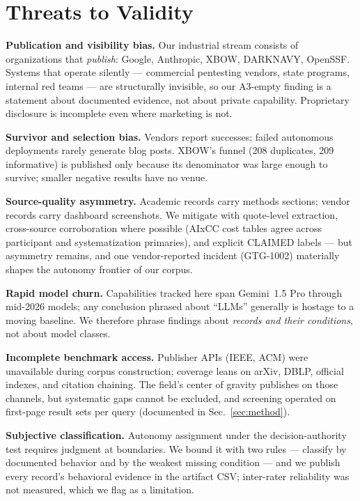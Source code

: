 \section{Threats to Validity}
\label{sec:threats}

\textbf{Publication and visibility bias.} Our industrial stream consists of organizations that
\emph{publish}: Google, Anthropic, XBOW, DARKNAVY, OpenSSF. Systems that operate silently ---
commercial pentesting vendors, state programs, internal red teams --- are structurally
invisible, so our A3-empty finding is a statement about documented evidence, not about private
capability. Proprietary disclosure is incomplete even where marketing is not.

\textbf{Survivor and selection bias.} Vendors report successes; failed autonomous deployments
rarely generate blog posts. XBOW's funnel (208 duplicates, 209 informative) is published only
because its denominator was large enough to survive; smaller negative results have no venue.

\textbf{Source-quality asymmetry.} Academic records carry methods sections; vendor records
carry dashboard screenshots. We mitigate with quote-level extraction, cross-source
corroboration where possible (AIxCC cost tables agree across participant and systematization
primaries), and explicit CLAIMED labels --- but asymmetry remains, and one vendor-reported
incident (GTG-1002) materially shapes the autonomy frontier of our corpus.

\textbf{Rapid model churn.} Capabilities tracked here span Gemini~1.5 Pro through mid-2026
models; any conclusion phrased about ``LLMs'' generally is hostage to a moving baseline. We
therefore phrase findings about \emph{records and their conditions}, not about model classes.

\textbf{Incomplete benchmark access.} Publisher APIs (IEEE, ACM) were unavailable during corpus
construction; coverage leans on arXiv, DBLP, official indexes, and citation chaining. The
field's center of gravity publishes on those channels, but systematic gaps cannot be excluded,
and screening operated on first-page result sets per query (documented in
Sec.~\ref{sec:method}).

\textbf{Subjective classification.} Autonomy assignment under the decision-authority test
requires judgment at boundaries. We bound it with two rules --- classify by documented behavior
and by the weakest missing condition --- and we publish every record's behavioral evidence in
the artifact CSV; inter-rater reliability was not measured, which we flag as a limitation.

